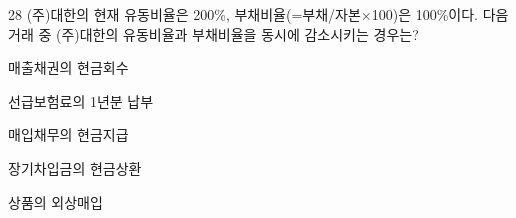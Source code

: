 \begin{question}{28}
(주)대한의 현재 유동비율은 200\%, 부채비율(=부채/자본×100)은 100\%이다. 다음 거래 중 (주)대한의 유동비율과 부채비율을 동시에 감소시키는 경우는?
\begin{choices}
  \item 매출채권의 현금회수
  \item 선급보험료의 1년분 납부
  \item 매입채무의 현금지급
  \item 장기차입금의 현금상환
  \item 상품의 외상매입
\end{choices}
\end{question}
